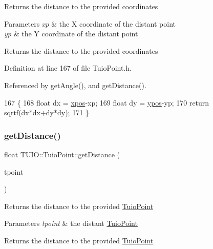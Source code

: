 Returns the distance to the provided coordinates


\begin{DoxyParams}{Parameters}
{\em xp} & the X coordinate of the distant point \\
\hline
{\em yp} & the Y coordinate of the distant point \\
\hline
\end{DoxyParams}
\begin{DoxyReturn}{Returns}
the distance to the provided coordinates 
\end{DoxyReturn}


Definition at line 167 of file Tuio\+Point.\+h.



Referenced by get\+Angle(), and get\+Distance().


\begin{DoxyCode}
167                                               \{
168             \textcolor{keywordtype}{float} dx = \hyperlink{class_t_u_i_o_1_1_tuio_point_a0021f8dfddd05f2a17e713a94f5457e6}{xpos}-xp;
169             \textcolor{keywordtype}{float} dy = \hyperlink{class_t_u_i_o_1_1_tuio_point_a89a038775a681166168735dbc95c7779}{ypos}-yp;
170             \textcolor{keywordflow}{return} sqrtf(dx*dx+dy*dy);
171         \}
\end{DoxyCode}
\mbox{\label{class_t_u_i_o_1_1_tuio_point_a2d1a0aa81271bbd2b1a43b0439706f4d}} 
\subsubsection{\texorpdfstring{get\+Distance()}{getDistance()}\hspace{0.1cm}{\footnotesize\ttfamily [2/2]}}
{\footnotesize\ttfamily float T\+U\+I\+O\+::\+Tuio\+Point\+::get\+Distance (\begin{DoxyParamCaption}\item[{\hyperlink{class_t_u_i_o_1_1_tuio_point}{Tuio\+Point} $\ast$}]{tpoint }\end{DoxyParamCaption})\hspace{0.3cm}{\ttfamily [inline]}}

Returns the distance to the provided \hyperlink{class_t_u_i_o_1_1_tuio_point}{Tuio\+Point}


\begin{DoxyParams}{Parameters}
{\em tpoint} & the distant \hyperlink{class_t_u_i_o_1_1_tuio_point}{Tuio\+Point} \\
\hline
\end{DoxyParams}
\begin{DoxyReturn}{Returns}
the distance to the provided \hyperlink{class_t_u_i_o_1_1_tuio_point}{Tuio\+Point} 
\end{DoxyReturn}


